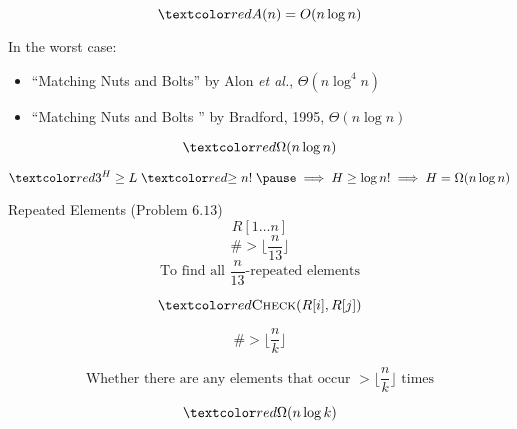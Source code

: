 \begin{frame}{}
  \centerline{}

  \pause
  \centerline{}

  \pause
  \[
    \red{A(n)} = O(n \log n)
  \]

  \pause
  \begin{alertblock}{In the worst case:}
	{\small
    \begin{itemize}
      \item ``Matching Nuts and Bolts'' by Alon \emph{et al.}, \hfill $\Theta(n \log^4 n)$
	  \item ``Matching Nuts and Bolts '' by Bradford, 1995, \hfill $\Theta(n \log n)$ 
    \end{itemize}
  }
  \end{alertblock}
\end{frame}

\begin{frame}{}

  \[
    \red{\Omega(n \log n)}
  \]

  \pause
  \[
    \red{3^{H}} \ge L \;\red{\ge n!}\; \pause \implies H \ge \log n! \implies H = \Omega(n \log n)
  \]
\end{frame}

\begin{frame}{}
  \begin{exampleblock}{Repeated Elements (Problem $6.13$)}
    \[
      R[1 \dots n]
    \]
    \[
      \# > \lfloor \frac{n}{13} \rfloor
    \]
    \[
      \text{To find all $\frac{n}{13}$-repeated elements}
    \]

    \[
      \red{\textsc{Check}(R[i], R[j])}
    \]
  \end{exampleblock}
\end{frame}

\begin{frame}{}
  \[
	\# > \lfloor \frac{n}{k} \rfloor
  \]

  \pause
  \[
	\text{Whether there are any elements that occur } > \lfloor \frac{n}{k} \rfloor \text{ times}
  \]

  \pause
  \[
    \red{\Omega(n \log k)}
  \]

  \pause

\end{frame}
